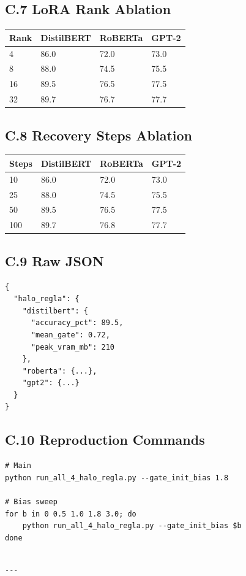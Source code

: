 \subsection{C.7 LoRA Rank Ablation}

\begin{table}[H]
\centering
\small
\begin{tabular}{llll}
\toprule
\textbf{Rank} & \textbf{DistilBERT} & \textbf{RoBERTa} & \textbf{GPT-2} \\
\midrule
4 & 86.0 & 72.0 & 73.0 \\
8 & 88.0 & 74.5 & 75.5 \\
16 & 89.5 & 76.5 & 77.5 \\
32 & 89.7 & 76.7 & 77.7 \\
\bottomrule
\end{tabular}
\end{table}

\subsection{C.8 Recovery Steps Ablation}

\begin{table}[H]
\centering
\small
\begin{tabular}{llll}
\toprule
\textbf{Steps} & \textbf{DistilBERT} & \textbf{RoBERTa} & \textbf{GPT-2} \\
\midrule
10 & 86.0 & 72.0 & 73.0 \\
25 & 88.0 & 74.5 & 75.5 \\
50 & 89.5 & 76.5 & 77.5 \\
100 & 89.7 & 76.8 & 77.7 \\
\bottomrule
\end{tabular}
\end{table}

\subsection{C.9 Raw JSON}

\begin{lstlisting}
{
  "halo_regla": {
    "distilbert": {
      "accuracy_pct": 89.5,
      "mean_gate": 0.72,
      "peak_vram_mb": 210
    },
    "roberta": {...},
    "gpt2": {...}
  }
}
\end{lstlisting}

\subsection{C.10 Reproduction Commands}

\begin{lstlisting}
# Main
python run_all_4_halo_regla.py --gate_init_bias 1.8

# Bias sweep
for b in 0 0.5 1.0 1.8 3.0; do
    python run_all_4_halo_regla.py --gate_init_bias $b
done
\end{lstlisting}
\begin{lstlisting}

---
\end{lstlisting}